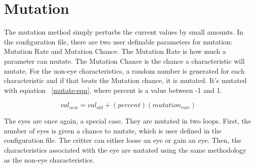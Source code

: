 \section{Mutation}
The mutation method simply perturbs the current values by small amounts. In the configuration file, there are two user definable parameters for mutation: Mutation Rate and Mutation Chance. The Mutation Rate is how much a parameter can mutate. The Mutation Chance is the chance a characteristic will mutate. For the non-eye characteristics, a random number is generated for each characteristic and if that beats the Mutation chance, it is mutated. It's mutated with equation ~\ref{mutate-eqn}, where percent is a value between -1 and 1. 

\begin{equation}
val_{new} = val_{old} + (percent) (mutation_{rate})
\end{equation} \label{mutate-eqn}


The eyes are once again, a special case. They are mutated in two loops. First, the number of eyes is given a chance to mutate, which is user defined in the configuration file. The critter can either loose an eye or gain an eye. Then, the characteristics associated with the eye are mutated using the same methodology as the non-eye characteristics. 





